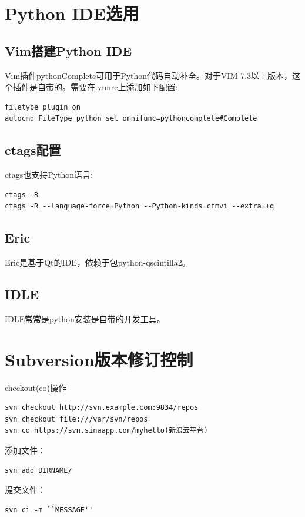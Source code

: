 \section{Python IDE选用}

\subsection{Vim搭建Python IDE}
Vim插件pythonComplete可用于Python代码自动补全。对于VIM 7.3以上版本，这个插件是自带的。需要在.vimrc上添加如下配置:
\begin{verbatim}
filetype plugin on  
autocmd FileType python set omnifunc=pythoncomplete#Complete  
\end{verbatim}

\subsection{ctags配置}
ctags也支持Python语言:
\begin{verbatim}
ctags -R
ctags -R --language-force=Python --Python-kinds=cfmvi --extra=+q
\end{verbatim}

\subsection{Eric}
Eric是基于Qt的IDE，依赖于包python-qscintilla2。

\subsection{IDLE}
IDLE常常是python安装是自带的开发工具。

\section{Subversion版本修订控制}
checkout(co)操作

\begin{verbatim}
svn checkout http://svn.example.com:9834/repos
svn checkout file:///var/svn/repos
svn co https://svn.sinaapp.com/myhello(新浪云平台) 
\end{verbatim}

添加文件：
\begin{verbatim}
svn add DIRNAME/
\end{verbatim}

提交文件：
\begin{verbatim}
svn ci -m ``MESSAGE''
\end{verbatim}






